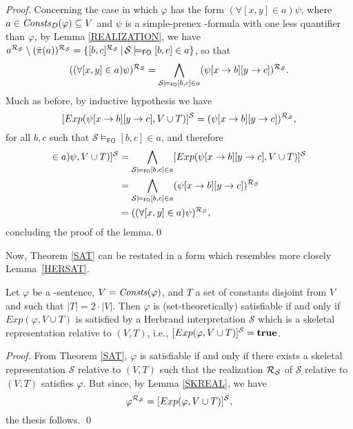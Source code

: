 \documentclass[a4paper]{llncs}
\newcommand{\HExp}{Exp}
\newcommand{\nonpairssym}{\bar{\pi}}
\newcommand{\nonpairs}[1]{\nonpairssym(#1)}
\newcommand{\atset}{\mathcal{S}}
\newcommand{\DomConsts}{\Consts_D}
\newcommand{\consta}{a}
\newcommand{\constb}{b}
\newcommand{\constc}{c}
\newcommand{\subst}[3]{#1[#2\rightarrow#3]}
\newcommand{\fomodels}[2]{#1 \models_{\mathsf{FO}} #2}
\begin{document}
\begin{proof}
Concerning the case in which $\varphi$ has the form
$(\forall [x,y] \in \consta)\psi$, where $a \in \DomConsts(\varphi) 
\subseteq V$ and $\psi$ is a simple-prenex \Forallpizero-formula with 
one less quantifier than $\varphi$, by Lemma \ref{REALIZATION}, we 
have
$\consta^{\Realization_{\!\atset}}
\setminus (\nonpairs{\consta})^{\Realization_{\!\atset}}=\{ [\constb, 
\constc]^{\Realization_{\!\atset}} \,|\,
\fomodels{\atset}{[\constb, \constc] \in \consta} \}$, so that
\[
((\forall [x,y] \in \consta)\psi)^{\Realization_{\!\atset}} = 
\bigwedge\limits_{\fomodels{\atset}{[\constb, \constc] \in\consta}} 
(\subst{\subst{\psi}{x}{\constb}}{y}{\constc})^{\Realization_{\!\atset}}. 
\]
Much as before, by inductive hypothesis we have
\[
   [\HExp(\subst{\subst{\psi}{x}{\constb}}{y}{\constc}, V \cup 
T)]^{\atset} = 
(\subst{\subst{\psi}{x}{\constb}}{y}{\constc})^{\Realization_{\!\atset}} 
,
\]
for all $b,c$ such that $\fomodels{\atset}{[\constb, \constc] 
\in\consta}$, and therefore
\begin{align*}
  [\HExp((\forall [x,y] \in \consta)\psi, V \cup T)]^{\atset} &=
  \bigwedge\limits_{\fomodels{\atset}{[\constb, \constc] 
\in\consta}}[\HExp(\subst{\subst{\psi}{x}{\constb}}{y}{\constc}, V 
\cup T)]^{\atset}  \\
&=  \bigwedge\limits_{\fomodels{\atset}{[\constb, \constc] 
\in\consta}} 
(\subst{\subst{\psi}{x}{\constb}}{y}{\constc})^{\Realization_{\!\atset}}\\
&= ((\forall [x,y] \in \consta)\psi)^{\Realization_{\!\atset}} ,
\end{align*}
concluding the proof of the lemma.\qed
\end{proof}
%
Now, Theorem \ref{SAT} can be restated in a form which resembles more closely
Lemma~\ref{HERSAT}.

\begin{corollary}\label{SATEXP}
Let $\varphi$ be a \Forallpizero-sentence, $V=\mathit{Consts}(\varphi)$,
and $T$ a set of constants disjoint from $V$ and such that
$|T|=2\cdot|V|$. Then $\varphi$ is (set-theoretically) satisfiable
if and only if $\HExp(\varphi, V\cup T)$ is satisfied by a Herbrand 
interpretation
$\atset$ which is a skeletal representation
relative to $(V,T)$, i.e., $[\HExp(\varphi, V\cup T)]^\atset = \true$.
\end{corollary}
\begin{proof}
 From Theorem \ref{SAT}, $\varphi$ is satisfiable if and only if
there exists a skeletal representation $\atset$
relative to $(V,T)$ such that the realization $\Realization_{\!\atset}$
of $\atset$ relative to $(V,T)$ satisfies $\varphi$. But since, by 
Lemma \ref{SKREAL}, we have
\[
  \varphi^{\Realization_{\!\atset}} = [\HExp(\varphi, V \cup T)]^{\atset},
\]
the thesis follows. \qed
\end{proof}
\end{document}
